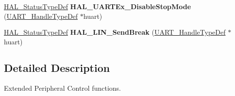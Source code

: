 \begin{DoxyCompactItemize}
\mbox{\label{group___u_a_r_t_ex___exported___functions___group3_gae396fbc25c33343afa0084d05f83a15a}} 
\hyperlink{stm32f0xx__hal__def_8h_a63c0679d1cb8b8c684fbb0632743478f}{H\+A\+L\+\_\+\+Status\+Type\+Def} {\bfseries H\+A\+L\+\_\+\+U\+A\+R\+T\+Ex\+\_\+\+Disable\+Stop\+Mode} (\hyperlink{struct_u_a_r_t___handle_type_def}{U\+A\+R\+T\+\_\+\+Handle\+Type\+Def} $\ast$huart)
\item 
\mbox{\label{group___u_a_r_t_ex___exported___functions___group3_gaffbf11fb4929f709004a11675cd25fcf}} 
\hyperlink{stm32f0xx__hal__def_8h_a63c0679d1cb8b8c684fbb0632743478f}{H\+A\+L\+\_\+\+Status\+Type\+Def} {\bfseries H\+A\+L\+\_\+\+L\+I\+N\+\_\+\+Send\+Break} (\hyperlink{struct_u_a_r_t___handle_type_def}{U\+A\+R\+T\+\_\+\+Handle\+Type\+Def} $\ast$huart)
\end{DoxyCompactItemize}


\subsection{Detailed Description}
Extended Peripheral Control functions. 

